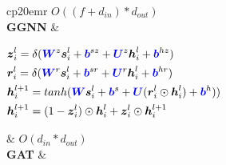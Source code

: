 \begin{table}
\begin{footnotesize}
\begin{tabular}{cp{20em}r}
			$O((f + d_{in}) * d_{out})$                                                                                                                                                                                        \\
			\textbf{GGNN}                                                                                                                                                                                                    &
			\begin{scriptsize}
				$\begin{aligned}[t]
						 & {\boldsymbol{z}}_i^l = \delta ( \textcolor{blue}{\boldsymbol{W}}^z \boldsymbol{s}_i^l + \textcolor{blue}{\boldsymbol{b}}^{sz} + \textcolor{blue}{\boldsymbol{U}}^z \boldsymbol{h}_i^{l} + \textcolor{blue}{\boldsymbol{b}}^{hz})                    \\
						 & \boldsymbol{r}_i^l = \delta ( \textcolor{blue}{\boldsymbol{W}}^r \boldsymbol{s}_i^l+ \textcolor{blue}{\boldsymbol{b}}^{sr} +\textcolor{blue}{\boldsymbol{U}}^r \boldsymbol{h}_i^{l} + \textcolor{blue}{\boldsymbol{b}}^{hr})                        \\
						 & \boldsymbol{h}_i^{l+1} = tanh ( \textcolor{blue}{\boldsymbol{W}} \boldsymbol{s}_i^l + \textcolor{blue}{\boldsymbol{b}}^s + \textcolor{blue}{\boldsymbol{U}} ( \boldsymbol{r}_i^l \odot \boldsymbol{h}_i^{l}) + \textcolor{blue}{\boldsymbol{b}}^h)) \\
						 & \boldsymbol{h}_i^{l+1} = (1 - {\boldsymbol{z}}_i^l) \odot \boldsymbol{h}_i^l + {\boldsymbol{z}}_i^l \odot \boldsymbol{h}_i^{l+1}
					\end{aligned}$
			\end{scriptsize}
			                                                                                                                                                                                                                 &
			$O(d_{in} * d_{out})$                                                                                                                                                                                              \\
			\textbf{GAT} &
\end{tabular}
\end{footnotesize}
\end{table}
